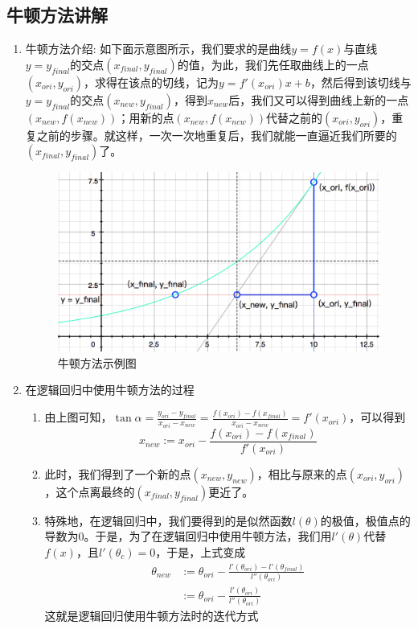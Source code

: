 \subsection{牛顿方法讲解}
\begin{enumerate}
	\item 牛顿方法介绍: 如下面示意图所示，我们要求的是曲线$y=f(x)$与直线$y=y_{final}$的交点$(x_{final}, y_{final})$的值，为此，我们先任取曲线上的一点$(x_{ori}, y_{ori})$，求得在该点的切线，记为$y=f'(x_{ori})x + b$，然后得到该切线与$y=y_{final}$的交点$(x_{new}, y_{final})$，得到$x_{new}$后，我们又可以得到曲线上新的一点$(x_{new}, f(x_{new}))$；用新的点$(x_{new}, f(x_{new}))$代替之前的$(x_{ori}, y_{ori})$，重复之前的步骤。就这样，一次一次地重复后，我们就能一直逼近我们所要的$(x_{final}, y_{final})$了。
	\begin{figure}[htbp]
		\centering
		\includegraphics[scale=0.9]{contents/牛顿方法示例图片}
		\caption{牛顿方法示例图}
	\end{figure}

	\item 在逻辑回归中使用牛顿方法的过程
	\begin{enumerate}
		\item 由上图可知，$\tan\alpha = \frac{y_{ori}-y_{final}}{x_{ori}-x_{new}} = \frac{f(x_{ori})-f(x_{final})}{x_{ori}-x_{new}} = f'(x_{ori})$，可以得到
		\begin{equation}
			x_{new} := x_{ori} - \frac{f(x_{ori})-f(x_{final})}{f'(x_{ori})}
		\end{equation}
		
		\item 此时，我们得到了一个新的点$(x_{new}, y_{new})$，相比与原来的点$(x_{ori},y_{ori})$，这个点离最终的$(x_{final}, y_{final})$更近了。

		\item 特殊地，在逻辑回归中，我们要得到的是似然函数$l(\theta)$的极值，极值点的导数为$0$。于是，为了在逻辑回归中使用牛顿方法，我们用$l'(\theta)$代替$f(x)$，且$l'(\theta_c) = 0$，于是，上式变成
		\begin{align}
			\theta_{new} &:= \theta_{ori} - \frac{l'(\theta_{ori})-l'(\theta_{final})}{l''(\theta_{ori})} \\
			&:=  \theta_{ori} - \frac{l'(\theta_{ori})}{l''(\theta_{ori})}
		\end{align}
		这就是逻辑回归使用牛顿方法时的迭代方式
	\end{enumerate}


\end{enumerate}
